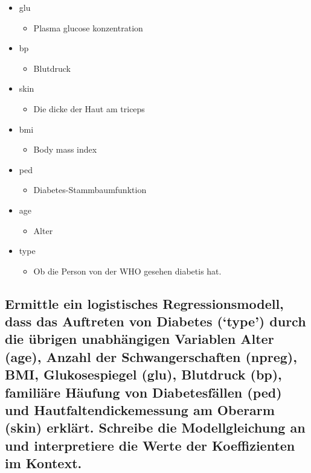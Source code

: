 \documentclass[
]{article}
\providecommand{\tightlist}{%
  \setlength{\itemsep}{0pt}\setlength{\parskip}{0pt}}
\begin{document}
\begin{itemize}
\item
  glu

  \begin{itemize}
  \tightlist
  \item
    Plasma glucose konzentration
  \end{itemize}
\item
  bp

  \begin{itemize}
  \tightlist
  \item
    Blutdruck
  \end{itemize}
\item
  skin

  \begin{itemize}
  \tightlist
  \item
    Die dicke der Haut am triceps
  \end{itemize}
\item
  bmi

  \begin{itemize}
  \tightlist
  \item
    Body mass index
  \end{itemize}
\item
  ped

  \begin{itemize}
  \tightlist
  \item
    Diabetes-Stammbaumfunktion
  \end{itemize}
\item
  age

  \begin{itemize}
  \tightlist
  \item
    Alter
  \end{itemize}
\item
  type

  \begin{itemize}
  \tightlist
  \item
    Ob die Person von der WHO gesehen diabetis hat.
  \end{itemize}
\end{itemize}

\subsection{Ermittle ein logistisches Regressionsmodell, dass das
Auftreten von Diabetes (`type') durch die übrigen unabhängigen Variablen
Alter (age), Anzahl der Schwangerschaften (npreg), BMI, Glukosespiegel
(glu), Blutdruck (bp), familiäre Häufung von Diabetesfällen (ped) und
Hautfaltendickemessung am Oberarm (skin) erklärt. Schreibe die
Modellgleichung an und interpretiere die Werte der Koeffizienten im
Kontext.}\label{ermittle-ein-logistisches-regressionsmodell-dass-das-auftreten-von-diabetes-type-durch-die-uxfcbrigen-unabhuxe4ngigen-variablen-alter-age-anzahl-der-schwangerschaften-npreg-bmi-glukosespiegel-glu-blutdruck-bp-familiuxe4re-huxe4ufung-von-diabetesfuxe4llen-ped-und-hautfaltendickemessung-am-oberarm-skin-erkluxe4rt.-schreibe-die-modellgleichung-an-und-interpretiere-die-werte-der-koeffizienten-im-kontext.}
\end{document}
